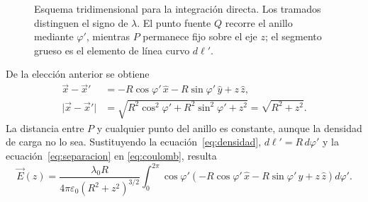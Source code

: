 \documentclass[11pt]{article}
\begin{document}
\begin{figure}[htbp]
\caption{Esquema tridimensional para la integración directa. Los tramados
distinguen el signo de $\lambda$. El punto fuente $Q$ recorre el anillo mediante
$\varphi'$, mientras $P$ permanece fijo sobre el eje $z$; el segmento grueso es
el elemento de línea curvo $d\ell'$.}
\label{fig:integracion-anillo}
\end{figure}

De la elección anterior se obtiene
\begin{equation}
\begin{aligned}
\vec x-\vec x'
&=-R\cos\varphi'\,\hat x-R\sin\varphi'\,\hat y+z\,\hat z,\\
\lvert\vec x-\vec x'\rvert
&=\sqrt{R^2\cos^2\varphi'+R^2\sin^2\varphi'+z^2}
=\sqrt{R^2+z^2}.
\end{aligned}
\label{eq:separacion}
\end{equation}
La distancia entre $P$ y cualquier punto del anillo es constante, aunque la
densidad de carga no lo sea. Sustituyendo la ecuación~\eqref{eq:densidad},
$d\ell'=R\,d\varphi'$ y la ecuación~\eqref{eq:separacion} en
\eqref{eq:coulomb}, resulta
\begin{equation}
\vec E(z)=\frac{\lambda_0R}{4\pi\varepsilon_0(R^2+z^2)^{3/2}}
\int_0^{2\pi}\cos\varphi'
\left(-R\cos\varphi'\,\hat x
-R\sin\varphi'\,\hat y+z\,\hat z\right)d\varphi'.
\label{eq:campo-integral}
\end{equation}
\end{document}
